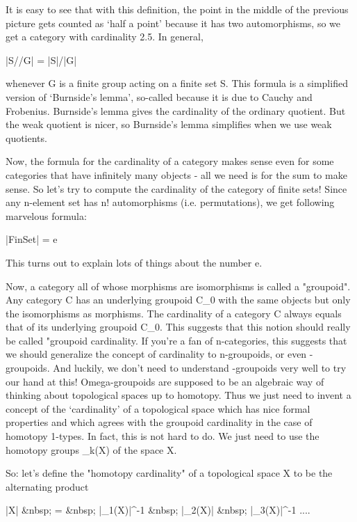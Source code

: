 It is easy to see that with this definition, the point in the middle
of the previous picture gets counted as `half a point' because it has
two automorphisms, so we get a category with cardinality 2.5.  In general,

                        |S//G| = |S|/|G|    

whenever G is a finite group acting on a finite set S.  This formula 
is a simplified version of `Burnside's lemma', so-called because it
is due to Cauchy and Frobenius.  Burnside's lemma gives the cardinality 
of the ordinary quotient.   But the weak quotient is nicer, so Burnside's
lemma simplifies when we use weak quotients.
 
Now, the formula for the cardinality of a category makes sense even
for some categories that have infinitely many objects - all we need is
for the sum to make sense.  So let's try to compute the cardinality
of the category of finite sets!   Since any n-element set has n! 
automorphisms (i.e. permutations), we get following marvelous formula:

                          |FinSet| = e 

This turns out to explain lots of things about the number e.  

Now, a category all of whose morphisms are isomorphisms is called
a "groupoid".  Any category C has an underlying groupoid 
C_{0} with the
same objects but only the isomorphisms as morphisms.  The cardinality 
of a category C always equals that of its underlying groupoid C_{0}.   
This suggests that this notion should really be called "groupoid 
cardinality.   If you're a fan of n-categories, this suggests that 
we should generalize the concept of cardinality to n-groupoids, or 
even \omega -groupoids.   And luckily, we don't need to understand 
\omega -groupoids very well to try our hand at this!  Omega-groupoids 
are supposed to be an algebraic way of thinking about topological spaces 
up to homotopy.  Thus we just need to invent a concept of the `cardinality' 
of a topological space which has nice formal properties and which agrees 
with the groupoid cardinality in the case of homotopy 1-types.  In fact, 
this is not hard to do.  We just need to use the homotopy groups 
\pi _{k}(X) of the space X.  

So: let's define the "homotopy cardinality" of a 
topological space X to be the alternating product 

     |X| &nbsp; = &nbsp; |\pi _{1}(X)|^{-1} &nbsp; 
                |\pi _{2}(X)|  &nbsp;
|\pi _{3}(X)|^{-1} ....

